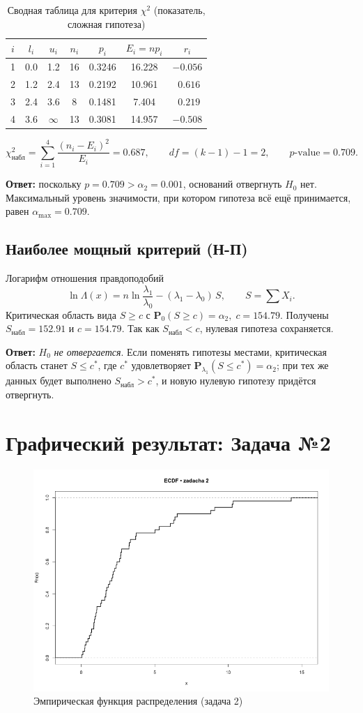 \documentclass[areasetadvanced]{scrartcl}
\begin{document}
\begin{longtable}{ccccccc}
\caption{Сводная таблица для критерия \(\chi^{2}\) (показатель, сложная гипотеза)}
\label{tab:chi2\_exp\_comp}\\[-1pt]\toprule
\(i\) & \(l_i\) & \(u_i\) & \(n_i\) & \(p_i\) & \(E_i=np_i\) & \(r_i\)\\\midrule
1 & 0.0 & 1.2 & 16 & 0.3246 & 16.228 & $-0.056$\\
2 & 1.2 & 2.4 & 13 & 0.2192 & 10.961 & $\,\,0.616$\\
3 & 2.4 & 3.6 &  8 & 0.1481 &  7.404 & $\,\,0.219$\\
4 & 3.6 & $\infty$ & 13 & 0.3081 & 14.957 & $-0.508$\\
\bottomrule
\end{longtable}

\[
\chi^{2}_{\text{набл}}
   =\sum_{i=1}^{4}\frac{(n_i-E_i)^2}{E_i}
   =0.687,\qquad
df=(k-1)-1=2,\qquad
p\text{-value}=0.709.
\]

\textbf{Ответ:} поскольку \(p=0.709>\alpha_2=0.001\),
оснований отвергнуть \(H_{0}\) нет.  
Максимальный уровень значимости, при котором гипотеза всё ещё принимается,
равен \(\displaystyle\alpha_{\max}=0.709\).


\subsection{Наиболее мощный критерий (Н-П)}
Логарифм отношения правдоподобий
\[
\ln\Lambda(x)=n\ln\frac{\lambda_1}{\lambda_0}
              -(\lambda_1-\lambda_0)\,S,\qquad
S=\sum X_i.
\]
Критическая область вида \(S\ge c\) с
\(
\mathbf P_{0}(S\ge c)=\alpha_2,\;
c=154.79.
\)
Получены \(S_{\text{набл}}=152.91\) и
\(c=154.79\).
Так как \(S_{\text{набл}}<c\),
нулевая гипотеза сохраняется.

\textbf{Ответ:}
\(H_0\) \emph{не отвергается}.
Если поменять гипотезы местами,
критическая область станет \(S\le c^{*}\),
где \(c^{*}\) удовлетворяет
\(\mathbf P_{\lambda_1}(S\le c^{*})=\alpha_2\);
при тех же данных будет выполнено
\(S_{\text{набл}}>c^{*}\), и новую нулевую гипотезу придётся
отвергнуть.

\newpage
\section{Графический результат: Задача №2}
\begin{figure}[H]\centering
\includegraphics[width=.72\linewidth]{fig/emp_dist_2.png}
\caption{Эмпирическая функция распределения (задача 2)}
\end{figure}
\end{document}
